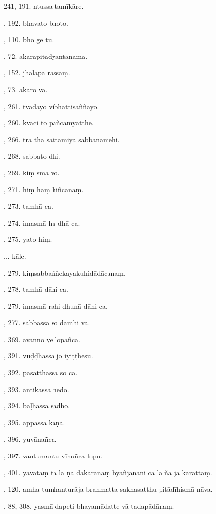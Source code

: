 241, 191. ntussa tamīkāre.\par {}, 192. bhavato bhoto.\par {}, 110. bho ge tu.\par {}, 72. akārapitādyantānamā.\par {}, 152. jhalapā rassaṃ.\par {}, 73. ākāro vā.\par {}, 261. tvādayo vibhattisaññāyo.\par {}, 260. kvaci to pañcamyatthe.\par {}, 266. tra tha sattamiyā sabbanāmehi.\par {}, 268. sabbato dhi.\par {}, 269. kiṃ smā vo.\par {}, 271. hiṃ haṃ hiñcanaṃ.\par {}, 273. tamhā ca.\par {}, 274. imasmā ha dhā ca.\par {}, 275. yato hiṃ.\par {},.. kāle.\par {}, 279. kiṃsabbaññekayakuhidādācanaṃ.\par {}, 278. tamhā dāni ca.\par {}, 279. imasmā rahi dhunā dāni ca.\par {}, 277. sabbassa so dāmhi vā.\par {}, 369. avaṇṇo ye lopañca.\par {}, 391. vuḍḍhassa jo iyiṭṭhesu.\par {}, 392. pasatthassa so ca.\par {}, 393. antikassa nedo.\par {}, 394. bāḷhassa sādho.\par {}, 395. appassa kaṇa.\par {}, 396. yuvānañca.\par {}, 397. vantumantu vīnañca lopo.\par {}, 401. yavataṃ ta la ṇa dakārānaṃ byañjanāni ca la ña ja kārattaṃ.\par {}, 120. amha tumhanturāja brahmatta sakhasatthu pitādīhismā nāva.\par {}, 88, 308. yasmā dapeti bhayamādatte vā tadapādānaṃ.\par \noindent
